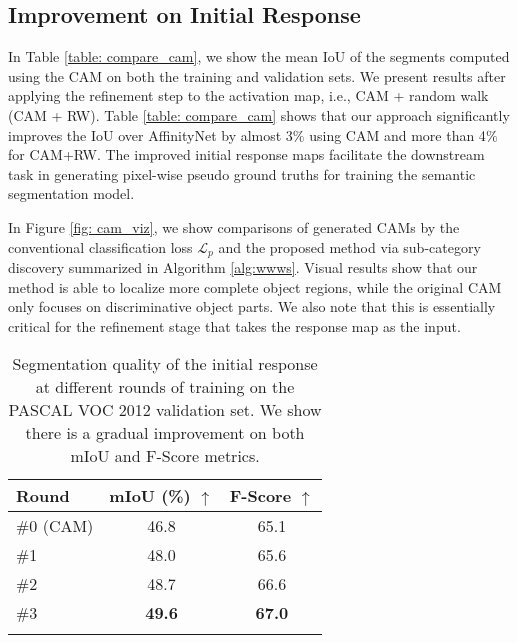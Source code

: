 \documentclass[10pt,twocolumn,letterpaper]{article}
\begin{document}
\subsection{Improvement on Initial Response}
In Table \ref{table: compare_cam}, we show the mean IoU of the segments computed using the CAM on both the training and validation sets.
We present results after applying the refinement step to the activation map, i.e., CAM + random walk (CAM + RW).
Table \ref{table: compare_cam} shows that our approach significantly improves the IoU over AffinityNet \cite{ahn2018learning} by almost 3$\%$ using CAM and more than 4$\%$ for CAM+RW.
The improved initial response maps facilitate the downstream task in generating pixel-wise pseudo ground truths for training the semantic segmentation model.


In Figure \ref{fig: cam_viz}, we show comparisons of generated CAMs by the conventional classification loss $\mathcal{L}_p$ \cite{zhou2016learning} and the proposed method via sub-category discovery summarized in Algorithm \ref{alg:wwws}.
Visual results show that our method is able to localize more complete object regions, while the original CAM only focuses on discriminative object parts.
We also note that this is essentially critical for the refinement stage that takes the response map as the input.





\begin{table}[!t]
	\caption{Segmentation quality of the initial response at different rounds of training on the PASCAL VOC 2012 validation set. We show there is a gradual improvement on both mIoU and F-Score metrics.}
	\vspace{-2mm}
	\small
	\centering
	\renewcommand{\arraystretch}{1.1}
	\setlength{\tabcolsep}{6pt}
	\begin{tabular}{lcc}
		\toprule
		Round & mIoU (\%) $\uparrow$ & F-Score $\uparrow$ \\
		\midrule
	
		\#0 (CAM) & 46.8 & 65.1 \\
		\#1 & 48.0 & 65.6 \\
		\#2 & 48.7 & 66.6 \\
		\#3 & \textbf{49.6} & \textbf{67.0} \\
		
		\bottomrule
	\label{table: iter_improve}
	\end{tabular}
	\vspace{-5mm}
\end{table}
\end{document}
